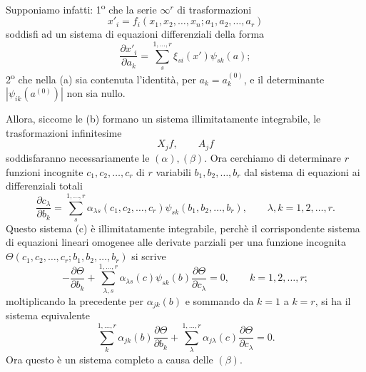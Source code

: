 \documentclass[11pt]{book}
\begin{document}
Supponiamo infatti: 1\textsuperscript{o} che la serie $\infty^r$ di trasformazioni
\begin{equation*}\tag{a}
 x'_i=f_i(x_1,x_2,\ldots,x_n; a_1,a_2,\ldots,a_r)
\end{equation*}
soddisfi ad un sistema di equazioni differenziali della forma
\begin{equation*}\tag{b}
 \frac{\partial x'_i}{\partial a_k}=\sum\limits_s^{1,\ldots,r}\xi_{si}(x')\psi_{sk}(a);
\end{equation*}
2\textsuperscript{o} che nella (a) sia contenuta l'identità, per $a_k=a_k^{(0)}$, e il determinante $|\psi_{ik}(a^{(0)})|$ non sia nullo.

Allora, siccome le (b) formano un sistema illimitatamente integrabile, le trasformazioni infinitesime
\[
 X_jf,\qquad A_jf
\]
soddisfaranno necessariamente le $(\alpha),(\beta)$. Ora cerchiamo di determinare $r$ funzioni incognite $c_1,c_2,\ldots,c_r$ di $r$ variabili $b_1,b_2,\ldots,b_r$ dal sistema di equazioni ai differenziali totali
\begin{equation*}\tag{c}
 \frac{\partial c_\lambda}{\partial b_k}=\sum\limits_s^{1,\ldots,r}\alpha_{\lambda s}(c_1,c_2,\ldots,c_r)\psi_{sk}(b_1,b_2,\ldots,b_r),
 \qquad \lambda,k=1,2,\ldots,r.
\end{equation*}
Questo sistema (c) è illimitatamente integrabile, perchè il corrispondente sistema di equazioni lineari omogenee alle derivate parziali per una funzione incognita $\Theta(c_1,c_2,\ldots,c_r;b_1,b_2,\ldots,b_r)$ si scrive
\[
 -\frac{\partial\Theta}{\partial b_k}+\sum\limits_{\lambda,s}^{1,\ldots,r}\alpha_{\lambda s}(c)\psi_{sk}(b)\frac{\partial\Theta}{\partial c_\lambda}=0,
 \qquad k=1,2,\ldots,r;
\]
moltiplicando la precedente per $\alpha_{jk}(b)$ e sommando da $k=1$ a $k=r$, si ha il sistema equivalente
\[
 \sum\limits_k^{1,\ldots,r}\alpha_{jk}(b)\frac{\partial\Theta}{\partial b_k}+\sum\limits_\lambda^{1,\ldots,r}\alpha_{j\lambda}(c)\frac{\partial\Theta}{\partial c_\lambda}=0.
\]
Ora questo è un sistema completo a causa delle $(\beta)$.
\end{document}
